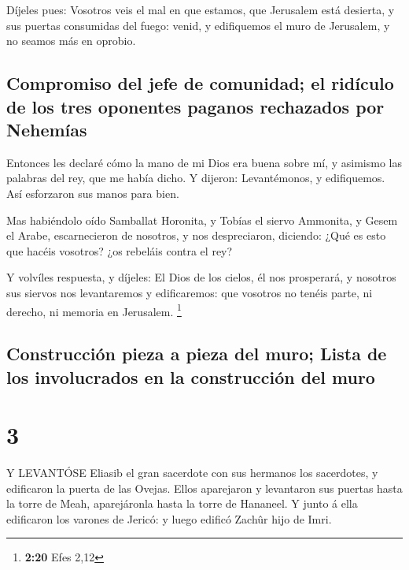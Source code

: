  Díjeles pues: Vosotros veis el mal en que estamos, que
Jerusalem está desierta, y sus puertas consumidas del fuego: venid, y
edifiquemos el muro de Jerusalem, y no seamos más en oprobio.

\hypertarget{compromiso-del-jefe-de-comunidad-el-riduxedculo-de-los-tres-oponentes-paganos-rechazados-por-nehemuxedas}{%
\subsection{Compromiso del jefe de comunidad; el ridículo de los tres
oponentes paganos rechazados por
Nehemías}\label{compromiso-del-jefe-de-comunidad-el-riduxedculo-de-los-tres-oponentes-paganos-rechazados-por-nehemuxedas}}

 Entonces les declaré cómo la mano de mi Dios era buena
sobre mí, y asimismo las palabras del rey, que me había dicho. Y
dijeron: Levantémonos, y edifiquemos. Así esforzaron sus manos para
bien.

 Mas habiéndolo oído Samballat Horonita, y Tobías el siervo
Ammonita, y Gesem el Arabe, escarnecieron de nosotros, y nos
despreciaron, diciendo: ¿Qué es esto que hacéis vosotros? ¿os rebeláis
contra el rey?

 Y volvíles respuesta, y díjeles: El Dios de los cielos, él
nos prosperará, y nosotros sus siervos nos levantaremos y edificaremos:
que vosotros no tenéis parte, ni derecho, ni memoria en Jerusalem.
\footnote{\textbf{2:20} Efes 2,12}

\hypertarget{construcciuxf3n-pieza-a-pieza-del-muro-lista-de-los-involucrados-en-la-construcciuxf3n-del-muro}{%
\subsection{Construcción pieza a pieza del muro; Lista de los
involucrados en la construcción del
muro}\label{construcciuxf3n-pieza-a-pieza-del-muro-lista-de-los-involucrados-en-la-construcciuxf3n-del-muro}}

\hypertarget{section-2}{%
\section{3}\label{section-2}}

 Y LEVANTÓSE Eliasib el gran sacerdote con sus hermanos los
sacerdotes, y edificaron la puerta de las Ovejas. Ellos aparejaron y
levantaron sus puertas hasta la torre de Meah, aparejáronla hasta la
torre de Hananeel.  Y junto á ella edificaron los varones de
Jericó: y luego edificó Zachûr hijo de Imri.


